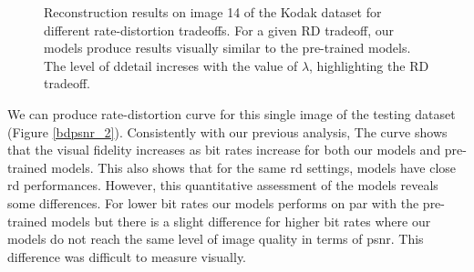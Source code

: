 \begin{figure}[H]
    \centering
    \caption[Reconstruction results on image 14 of the Kodak dataset for different rate-distortion tradeoffs.]{Reconstruction results on image 14 of the Kodak dataset for different rate-distortion tradeoffs. For a given \acrshort{RD} tradeoff, our models produce results visually similar to the pre-trained models. The level of ddetail increses with the value of \(\lambda\), highlighting the \acrshort{RD} tradeoff.}
    \label{bdpsnr_1}
\end{figure}

We can produce rate-distortion curve for this single image of the testing dataset (Figure \ref{bdpsnr_2}). Consistently with our previous analysis, The curve shows that the visual fidelity increases as bit rates increase for both our models and pre-trained models. This also shows that for the same \acrshort{rd} settings, models have close \acrshort{rd} performances. However, this quantitative assessment of the models reveals some differences. For lower bit rates our models performs on par with the pre-trained models but there is a slight difference for higher bit rates where our models do not reach the same level of image quality in terms of \acrshort{psnr}. This difference was difficult to measure visually.

